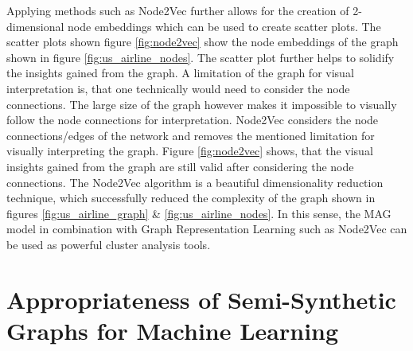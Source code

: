   \noindent Applying methods such as Node2Vec further allows for the creation
  of 2-dimensional node embeddings which can be used to create scatter plots. The
  scatter plots shown figure \ref{fig:node2vec} show the node embeddings of the
  graph shown in figure \ref{fig:us_airline_nodes}. The scatter plot further
  helps to solidify the insights gained from the graph. A limitation of the
  graph for visual interpretation is, that one technically would need to
  consider the node connections. The large size of the graph however makes it
  impossible to visually follow the node connections for interpretation. Node2Vec
  considers the node connections/edges of the network and removes the mentioned
  limitation for visually interpreting the graph. Figure \ref{fig:node2vec}
  shows, that the visual insights gained from the graph are still valid after
  considering the node connections. The Node2Vec algorithm is a beautiful
  dimensionality reduction technique, which successfully reduced the complexity
  of the graph shown in figures \ref{fig:us_airline_graph} \& 
  \ref{fig:us_airline_nodes}. In this sense, the MAG model in combination with
  Graph Representation Learning such as Node2Vec can be used as powerful
  cluster analysis tools.
  
  \section{Appropriateness of Semi-Synthetic Graphs for Machine Learning}
  \label{section:gml_performance}

